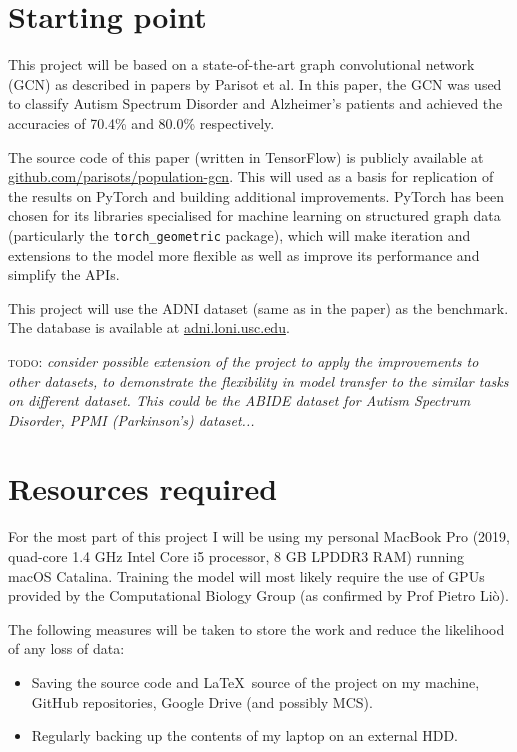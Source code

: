 \documentclass[12pt,a4paper,twoside]{article}
\begin{document}
\section*{Starting point}


This project will be based on a state-of-the-art graph convolutional network (GCN) as described in papers by Parisot et al. \cite{parisot2017spectral} \cite{parisot2018disease} In this paper, the GCN was used to classify Autism Spectrum Disorder and Alzheimer's patients and achieved the accuracies of 70.4\% and 80.0\% respectively. 

The source code of this paper (written in TensorFlow) is publicly available at \url{github.com/parisots/population-gcn}. This will used as a basis for replication of the results on PyTorch and building additional improvements. PyTorch has been chosen for its libraries specialised for machine learning on structured graph data (particularly the \texttt{torch\_geometric} package), which will make iteration and extensions to the model more flexible as well as improve its performance and simplify the APIs.

This project will use the ADNI dataset (same as in the paper) as the benchmark. The database is available at \url{adni.loni.usc.edu}.

\textsc{todo:} \textit{consider possible extension of the project to apply the improvements to other datasets, to demonstrate the flexibility in model transfer to the similar tasks on different dataset. This could be the ABIDE dataset for Autism Spectrum Disorder, PPMI (Parkinson's) dataset...}

\section*{Resources required}

For the most part of this project I will be using my personal MacBook Pro (2019, quad-core 1.4 GHz Intel Core i5 processor, 8 GB LPDDR3 RAM) running macOS Catalina. Training the model will most likely require the use of GPUs provided by the Computational Biology Group (as confirmed by Prof Pietro Liò).

The following measures will be taken to store the work and reduce the likelihood of any loss of data: 
\begin{itemize}
  \item Saving the source code and \LaTeX\ source of the project on my machine, GitHub repositories, Google Drive (and possibly MCS).
  \item Regularly backing up the contents of my laptop on an external HDD.
\end{itemize}
\end{document}

